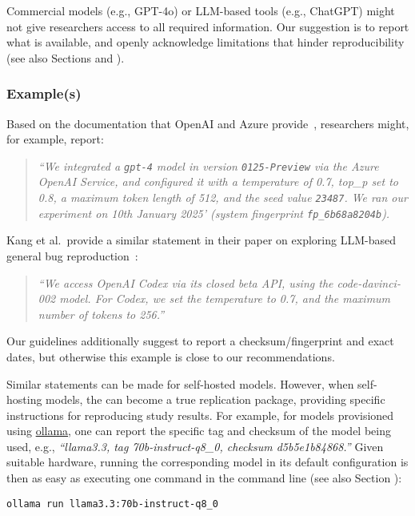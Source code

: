 Commercial models (e.g., GPT-4o) or LLM-based tools (e.g., ChatGPT) might not give researchers access to all required information.
Our suggestion is to report what is available, and openly acknowledge limitations that hinder reproducibility (see also Sections \prompts and \limitationsmitigations).


\subsubsection{Example(s)}

Based on the documentation that OpenAI and Azure provide~\cite{OpenAI25, Azure25}, researchers might, for example, report:

\begin{quote}
\it
 ``We integrated a  \texttt{gpt-4} model in version \texttt{0125-Preview} via the Azure OpenAI Service, and configured it with a temperature of 0.7, top\_p set to 0.8, a maximum token length of 512, and the  seed value \texttt{23487}.
 We ran our experiment on 10th January 2025' (system fingerprint \texttt{fp\_6b68a8204b}).
\end{quote}

Kang et al.~provide a similar statement in their paper on exploring LLM-based general bug reproduction~\cite{DBLP:conf/icse/KangYY23}:

\begin{quote}
\it
``We access OpenAI Codex via its closed beta API, using the code-davinci-002 model. For Codex, we set the temperature to 0.7, and the maximum number of tokens to 256.''
\end{quote}

Our guidelines additionally suggest to report a checksum/fingerprint and exact dates, but otherwise this example is close to our recommendations. 

Similar statements can be made for self-hosted models.
However, when self-hosting models, the \supplementarymaterial can become a true replication package, providing specific instructions for reproducing study results.
For example, for models provisioned using \href{https://ollama.com/library/}{ollama}, one can report the specific tag and checksum of the model being used, e.g., \emph{``llama3.3, tag 70b-instruct-q8\_0, checksum d5b5e1b84868.''}
Given suitable hardware, running the corresponding model in its default configuration is then as easy as executing one command in the command line (see also Section \openllm):

\begin{verbatim}
ollama run llama3.3:70b-instruct-q8_0
\end{verbatim}

